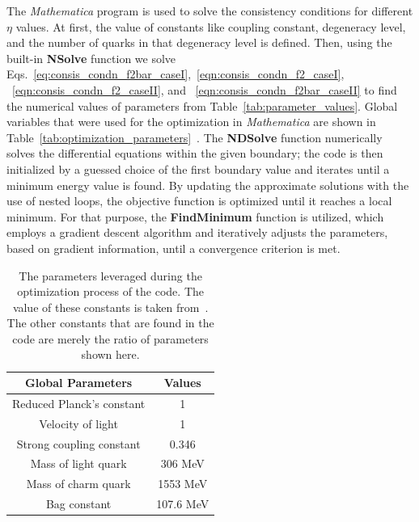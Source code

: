 \documentclass[fleqn]{article}
\begin{document}
    The {\it Mathematica} program is used to solve the consistency conditions for different $\eta$ values. At first, the value of constants like coupling constant, degeneracy level, and the number of quarks in that degeneracy level is defined. Then,  using the built-in \textbf{NSolve} function we solve Eqs.~\eqref{eq:consis_condn_f2bar_caseI},~\eqref{eqn:consis_condn_f2_caseI}, ~\eqref{eqn:consis_condn_f2_caseII}, and ~\eqref{eqn:consis_condn_f2bar_caseII} to find the numerical values of parameters from Table~\eqref{tab:parameter_values}. Global variables that were used for the optimization in {\it Mathematica} are shown in Table~\eqref{tab:optimization_parameters}~\cite{Baral:2019qpl}.
   The \textbf{NDSolve} function numerically solves the differential equations within the given boundary; the code is then initialized by a guessed choice of the first boundary value and iterates until a minimum energy value is found. By updating the approximate solutions with the use of nested loops, the objective function is optimized until it reaches a local minimum. For that purpose, the \textbf{FindMinimum} function is utilized, which employs a gradient descent algorithm and iteratively adjusts the parameters, based on gradient information, until a convergence criterion is met. 
    \begin{table}
\centering
\caption{The parameters leveraged during the optimization process of the code. The value of these constants is taken from~\cite{Baral:2019qpl}. The other constants that are found in the code are merely the ratio of parameters shown here.}
 \vspace{0.85cm}
         \begin{tabular}{c c  }
                    \hline
                    Global Parameters & Values  \\
                    \hline
                    Reduced Planck's constant & 1 \\
                    Velocity of light & 1 \\
                    Strong coupling constant & 0.346 \\
                    Mass of light quark & 306 MeV \\
                    Mass of charm quark & 1553 MeV \\
                    Bag constant & 107.6 MeV \\
                    \hline
                    \end{tabular}
            \label{tab:optimization_parameters}        
            \end{table}
\end{document}
